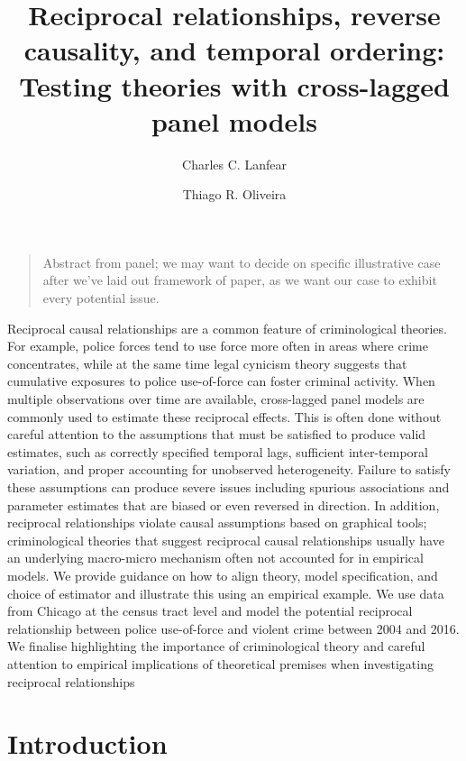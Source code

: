 \documentclass[
  letterpaper,
  DIV=11,
  numbers=noendperiod]{scrartcl}
\title{Reciprocal relationships, reverse causality, and temporal
ordering: Testing theories with cross-lagged panel models}
\author{Charles C. Lanfear \and Thiago R. Oliveira}
\date{}
\begin{document}
\maketitle

\begin{quote}
Abstract from panel; we may want to decide on specific illustrative case
after we've laid out framework of paper, as we want our case to exhibit
every potential issue.
\end{quote}

Reciprocal causal relationships are a common feature of criminological
theories. For example, police forces tend to use force more often in
areas where crime concentrates, while at the same time legal cynicism
theory suggests that cumulative exposures to police use-of-force can
foster criminal activity. When multiple observations over time are
available, cross-lagged panel models are commonly used to estimate these
reciprocal effects. This is often done without careful attention to the
assumptions that must be satisfied to produce valid estimates, such as
correctly specified temporal lags, sufficient inter-temporal variation,
and proper accounting for unobserved heterogeneity. Failure to satisfy
these assumptions can produce severe issues including spurious
associations and parameter estimates that are biased or even reversed in
direction. In addition, reciprocal relationships violate causal
assumptions based on graphical tools; criminological theories that
suggest reciprocal causal relationships usually have an underlying
macro-micro mechanism often not accounted for in empirical models. We
provide guidance on how to align theory, model specification, and choice
of estimator and illustrate this using an empirical example. We use data
from Chicago at the census tract level and model the potential
reciprocal relationship between police use-of-force and violent crime
between 2004 and 2016. We finalise highlighting the importance of
criminological theory and careful attention to empirical implications of
theoretical premises when investigating reciprocal relationships

\section{Introduction}\label{introduction}
\end{document}
